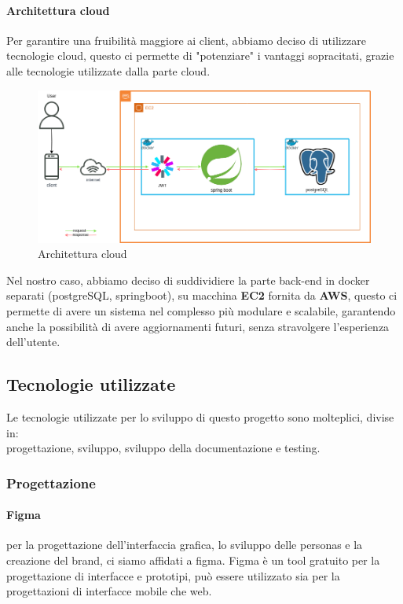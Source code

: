 \paragraph{Architettura cloud}
Per garantire una fruibilità maggiore ai client, abbiamo deciso di utilizzare tecnologie cloud, questo ci permette di "potenziare" i vantaggi sopracitati, grazie alle tecnologie utilizzate dalla parte cloud.
\begin{figure}[H]
  \centering
  \includegraphics[scale=0.45]{img/architectureDesign/AWS.png}
  \caption{Architettura cloud}
\end{figure}
Nel nostro caso, abbiamo deciso di suddividiere la parte back-end in docker separati (postgreSQL, springboot), su macchina \textbf{EC2} fornita da \textbf{AWS}, questo ci permette di avere un sistema nel complesso più modulare e scalabile, garantendo anche la possibilità di avere aggiornamenti futuri, senza stravolgere l'esperienza dell'utente. 
\newpage
\subsection{Tecnologie utilizzate}
Le tecnologie utilizzate per lo sviluppo di questo progetto sono molteplici, divise in:\\
 progettazione, sviluppo, sviluppo della documentazione e testing.
\subsubsection{Progettazione}
\paragraph{Figma} per la progettazione dell'interfaccia grafica, lo sviluppo delle personas e la creazione del brand, ci siamo affidati a figma. Figma è un tool gratuito per la progettazione di interfacce e prototipi, può essere utilizzato sia per la progettazioni di interfacce mobile che web.
